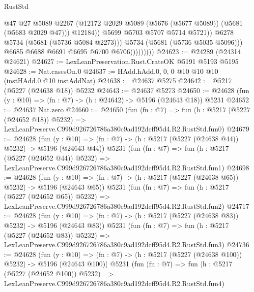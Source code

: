 \begin{lexlean}{RustStd}
\begin{coremodule}
                                  @47
                                  @27
                                  @5089
                                  @2267
                                  (@12172
                                    @2029
                                    @5089
                                    (@5676 (@5677 @5089))
                                    (@5681 (@5683 @2029 @47)))
                                  @12184))
                              @5699
                              @5703
                              @5707
                              @5714
                              @5721))
                          @6278
                          @5734
                          (@5681 (@5736 @5084 @2273)))
                        @5734
                        (@5681 (@5736 @5035 @5096)))
                      @6685
                      @6688
                      @6691
                      @6695
                      @6700
                      @6706)))))))))
@24623 := @24289 (@24314 @24621)
@24627 := LexLeanPreservation.Rust.CrateOK @5191 @5193 @5195
@24628 := Nat.casesOn.{0}
@24637 := HAdd.hAdd.{0, 0, 0} @10 @10 @10 (instHAdd.{0} @10 instAddNat)
@24638 := @24637 @5275
@24642 := @5217 (@5227 (@24638 @18)) @5232
@24643 := @24637 @5273
@24650 := @24628 (fun (y : @10) => (fn : @7) -> (h : @24642) -> @5196 (@24643 @18)) @5231
@24652 := @24637 Nat.zero
@24660 := @24650
    (fun (fn : @7) =>
    fun (h : @5217 (@5227 (@24652 @18)) @5232) =>
    LexLeanPreserve.C999d926726786a380c9ad192dcff95d4.R2.RustStd.fun0)
@24679 := @24628
    (fun (y : @10) => (fn : @7) -> (h : @5217 (@5227 (@24638 @44)) @5232) -> @5196 (@24643 @44))
    @5231
    (fun (fn : @7) =>
    fun (h : @5217 (@5227 (@24652 @44)) @5232) =>
    LexLeanPreserve.C999d926726786a380c9ad192dcff95d4.R2.RustStd.fun1)
@24698 := @24628
    (fun (y : @10) => (fn : @7) -> (h : @5217 (@5227 (@24638 @65)) @5232) -> @5196 (@24643 @65))
    @5231
    (fun (fn : @7) =>
    fun (h : @5217 (@5227 (@24652 @65)) @5232) =>
    LexLeanPreserve.C999d926726786a380c9ad192dcff95d4.R2.RustStd.fun2)
@24717 := @24628
    (fun (y : @10) => (fn : @7) -> (h : @5217 (@5227 (@24638 @83)) @5232) -> @5196 (@24643 @83))
    @5231
    (fun (fn : @7) =>
    fun (h : @5217 (@5227 (@24652 @83)) @5232) =>
    LexLeanPreserve.C999d926726786a380c9ad192dcff95d4.R2.RustStd.fun3)
@24736 := @24628
    (fun (y : @10) => (fn : @7) -> (h : @5217 (@5227 (@24638 @100)) @5232) -> @5196 (@24643 @100))
    @5231
    (fun (fn : @7) =>
    fun (h : @5217 (@5227 (@24652 @100)) @5232) =>
    LexLeanPreserve.C999d926726786a380c9ad192dcff95d4.R2.RustStd.fun4)

\end{coremodule}
\end{lexlean}
